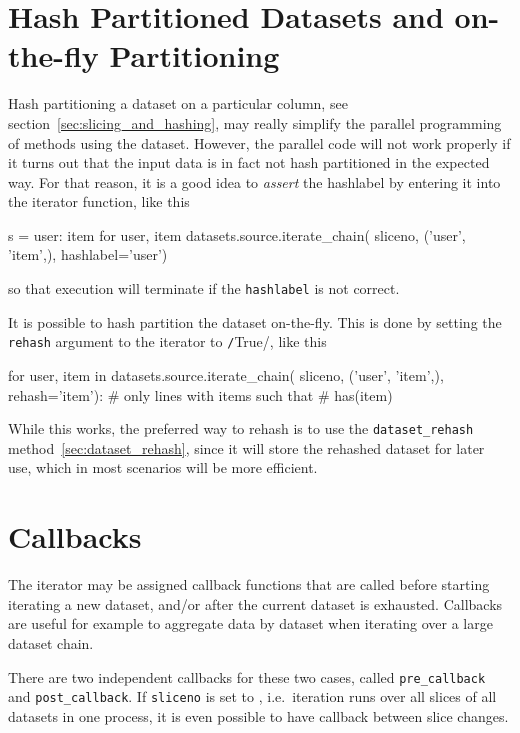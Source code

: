 \section{Hash Partitioned Datasets and on-the-fly Partitioning}
Hash partitioning a dataset on a particular column, see
section~\ref{sec:slicing_and_hashing}, may really simplify the
parallel programming of methods using the dataset.  However, the
parallel code will not work properly if it turns out that the input
data is in fact not hash partitioned in the expected way.  For that
reason, it is a good idea to \emph{assert} the hashlabel by entering
it into the iterator function, like this
\begin{python}
s = {user: item for user, item datasets.source.iterate_chain(
     sliceno, ('user', 'item',), hashlabel='user')}
\end{python}
so that execution will terminate if the \texttt{hashlabel} is not correct.

It is possible to hash partition the dataset on-the-fly.  This is done
by setting the \texttt{rehash} argument to the iterator to
\texttt/True/, like this
\begin{python}
for user, item in datasets.source.iterate_chain(
                       sliceno, ('user', 'item',),
                       rehash='item'):
    # only lines with items such that
    # has(item) %
\end{python}
While this works, the preferred way to rehash is to use the
\texttt{dataset\_rehash} method~\ref{sec:dataset_rehash},
since it will store the rehashed dataset for later use, which in most
scenarios will be more efficient.






\section{Callbacks}
\label{sec:callback}
The iterator may be assigned callback functions that are called before
starting iterating a new dataset, and/or after the current dataset is
exhausted.  Callbacks are useful for example to aggregate data by
dataset when iterating over a large dataset chain.

There are two independent callbacks for these two cases,
called \texttt{pre\_callback} and \texttt{post\_callback}.
If \texttt{sliceno} is set to \pyNone, i.e.\ iteration runs over all
slices of all datasets in one process, it is even possible to have
callback between slice changes.

